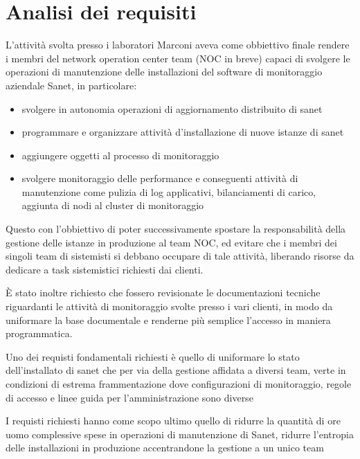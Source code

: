 \chapter{Analisi dei requisiti}

L'attività svolta presso i laboratori Marconi aveva come obbiettivo finale rendere i membri del network operation center team (NOC in breve) capaci di svolgere le operazioni di manutenzione delle installazioni del software di monitoraggio aziendale Sanet, in particolare:

\begin{itemize}
\item svolgere in autonomia operazioni di aggiornamento distribuito di sanet
\item programmare e organizzare attività d'installazione di nuove istanze di sanet
\item aggiungere oggetti al processo di monitoraggio
\item svolgere monitoraggio delle performance e conseguenti attività di manutenzione come pulizia di log applicativi, bilanciamenti di carico, aggiunta di nodi al cluster di monitoraggio
\end{itemize}

Questo con l'obbiettivo di poter successivamente spostare la responsabilità della gestione delle istanze in produzione al team NOC, ed evitare che i membri dei singoli team di sistemisti si debbano occupare di tale attività, liberando risorse da dedicare a task sistemistici richiesti dai clienti.

È stato inoltre richiesto che fossero revisionate le documentazioni tecniche riguardanti le attività di monitoraggio svolte presso i vari clienti, in modo da uniformare la base documentale e renderne più semplice l'accesso in maniera programmatica.

Uno dei requisti fondamentali richiesti è quello di uniformare lo stato dell'installato di sanet che per via della gestione affidata a diversi team, verte in condizioni di estrema frammentazione dove configurazioni di monitoraggio, regole di accesso e linee guida per l'amministrazione sono diverse

I requisti richiesti hanno come scopo ultimo quello di ridurre la quantità di ore uomo complessive spese in operazioni di manutenzione di Sanet, ridurre l'entropia delle installazioni in produzione accentrandone la gestione a un unico team

